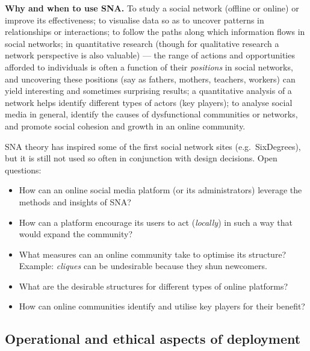 \documentclass[11pt,a4paper]{article}
\theoremstyle{definition}
\begin{document}
\textbf{Why and when to use SNA.} To study a social network (offline or online) or improve its
effectiveness; to visualise data so as to uncover patterns in relationships or interactions; to follow
the paths along which information flows in social networks; in quantitative research (though for
qualitative research a network perspective is also valuable) --- the range of actions and
opportunities afforded to individuals is often a function of their \emph{positions} in social
networks, and uncovering these positions (say as fathers, mothers, teachers, workers) can yield
interesting and sometimes surprising results; a quantitative analysis of a network helps identify
different types of actors (key players); to analyse social media in general, identify the causes of
dysfunctional communities or networks, and promote social cohesion and growth in an online community.

\begin{poznbox}
SNA theory has inspired some of the first social network sites (e.g.\ SixDegrees), but it is still not
used so often in conjunction with design decisions. Open questions:
\begin{itemize}
\item How can an online social media platform (or its administrators) leverage the methods and
      insights of SNA?
\item How can a platform encourage its users to act (\emph{locally}) in such a way that would expand
      the community?
\item What measures can an online community take to optimise its structure? Example: \emph{cliques}
      can be undesirable because they shun newcomers.
\item What are the desirable structures for different types of online platforms?
\item How can online communities identify and utilise key players for their benefit?
\end{itemize}
\end{poznbox}

\subsection{Operational and ethical aspects of deployment}
\end{document}
